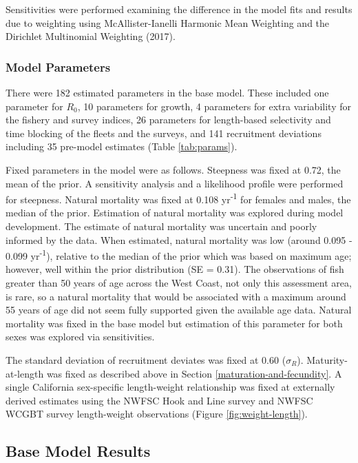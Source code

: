 \documentclass[11pt,
  english,
  letterpaper,
]{article}
\begin{document}
Sensitivities were performed examining the difference in the model fits and results due to weighting using McAllister-Ianelli Harmonic Mean Weighting and the Dirichlet Multinomial Weighting (2017).

\hypertarget{model-parameters}{%
\subsubsection{Model Parameters}\label{model-parameters}}

There were 182 estimated parameters in the base model. These included one parameter for \(R_0\), 10 parameters for growth, 4 parameters for extra variability for the fishery and survey indices, 26 parameters for length-based selectivity and time blocking of the fleets and the surveys, and 141 recruitment deviations including 35 pre-model estimates (Table \ref{tab:params}).

Fixed parameters in the model were as follows. Steepness was fixed at 0.72, the mean of the prior. A sensitivity analysis and a likelihood profile were performed for steepness. Natural mortality was fixed at 0.108 yr\textsuperscript{-1} for females and males, the median of the prior. Estimation of natural mortality was explored during model development. The estimate of natural mortality was uncertain and poorly informed by the data. When estimated, natural mortality was low (around 0.095 - 0.099 yr\textsuperscript{-1}), relative to the median of the prior which was based on maximum age; however, well within the prior distribution (SE = 0.31). The observations of fish greater than 50 years of age across the West Coast, not only this assessment area, is rare, so a natural mortality that would be associated with a maximum around 55 years of age did not seem fully supported given the available age data. Natural mortality was fixed in the base model but estimation of this parameter for both sexes was explored via sensitivities.

The standard deviation of recruitment deviates was fixed at 0.60 (\(\sigma_R\)). Maturity-at-length was fixed as described above in Section \ref{maturation-and-fecundity}. A single California sex-specific length-weight relationship was fixed at externally derived estimates using the NWFSC Hook and Line survey and NWFSC WCGBT survey length-weight observations (Figure \ref{fig:weight-length}).

\hypertarget{base-model-results}{%
\subsection{Base Model Results}\label{base-model-results}}
\end{document}
